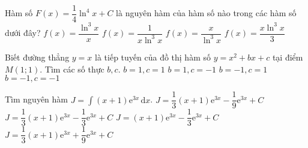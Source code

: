 \begin{ex}%
	Hàm số $F(x)=\dfrac{1}{4}\ln^4x+C$ là nguyên hàm của hàm số nào trong các hàm số dưới đây?
	\choice
	{\True $f(x)=\dfrac{\ln^3x}{x}$}
	{$f(x)=\dfrac{1}{x\ln^3x}$}
	{$f(x)=\dfrac{x}{\ln^3x}$}
	{$f(x)=\dfrac{x\ln^3x}{3}$}
\end{ex}

\begin{ex}%
	Biết đường thẳng $y=x$ là tiếp tuyến của đồ thị hàm số $y=x^2+bx+c$ tại điểm $M(1;1)$. Tìm các số thực $b,c$.
	\choice
	{$b=1,c=1$}
	{$b=1,c=-1$}
	{\True $b=-1,c=1$}
	{$b=-1,c=-1$}
\end{ex}

\begin{ex}%
	Tìm nguyên hàm $J=\displaystyle\int (x+1)\mathrm{e}^{3x}\mathrm{\,d}x$.
	\choice
	{\True $J=\dfrac{1}{3}(x+1)\mathrm{e}^{3x}-\dfrac{1}{9}\mathrm{e}^{3x}+C$}
	{$J=\dfrac{1}{3}(x+1)\mathrm{e}^{3x}-\dfrac{1}{3}\mathrm{e}^{3x}+C$}
	{$J=(x+1)\mathrm{e}^{3x}-\dfrac{1}{3}\mathrm{e}^{3x}+C$}
	{$J=\dfrac{1}{3}(x+1)\mathrm{e}^{3x}+\dfrac{1}{9}\mathrm{e}^{3x}+C$}
\end{ex}

